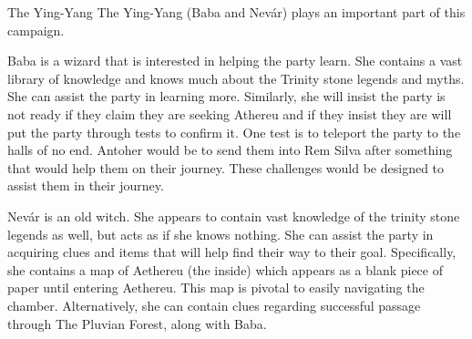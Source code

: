\begin{commentbox}{The Ying-Yang}
	The Ying-Yang (Baba and Nev\'{a}r) plays an important part of this campaign. 
	
	Baba is a wizard that is interested in helping the party learn. She contains a vast library of knowledge and knows much about the Trinity stone legends and myths. She can assist the party in learning more. Similarly, she will insist the party is not ready if they claim they are seeking Athereu and if they insist they are will put the party through tests to confirm it. One test is to teleport the party to the halls of no end. Antoher would be to send them into Rem Silva after something that would help them on their journey. These challenges would be designed to assist them in their journey. 
	
	Nev\'{a}r is an old witch. She appears to contain vast knowledge of the trinity stone legends as well, but acts as if she knows nothing. She can assist the party in acquiring clues and items that will help find their way to their goal. Specifically, she contains a map of Aethereu (the inside) which appears as a blank piece of paper until entering Aethereu. This map is pivotal to easily navigating the chamber. Alternatively, she can contain clues regarding successful passage through The Pluvian Forest, along with Baba.
\end{commentbox}

